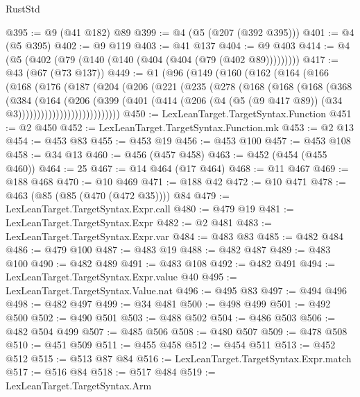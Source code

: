 \begin{lexlean}{RustStd}
\begin{coremodule}
{\begin{coremodule}
{{{{{{{{{{@395 := @9 (@41 @182) @89
@399 := @4 (@5 (@207 (@392 @395)))
@401 := @4 (@5 @395)
@402 := @9 @119
@403 := @41 @137
@404 := @9 @403
@414 := @4 (@5 (@402 (@79 (@140 (@140 (@404 (@404 (@79 (@402 @89)))))))))
@417 := @43 (@67 (@73 @137))
@449 := @1
    (@96
      (@149
        (@160
          (@162
            (@164
              (@166
                (@168
                  (@176
                    (@187
                      (@204
                        (@206
                          (@221
                            (@235
                              (@278
                                (@168
                                  (@168
                                    (@168
                                      (@368
                                        (@384
                                          (@164
                                            (@206
                                              (@399
                                                (@401
                                                  (@414
                                                    (@206
                                                      (@4
                                                        (@5 (@9 @417 @89))
                                                        (@34 @3)))))))))))))))))))))))))))
@450 := LexLeanTarget.TargetSyntax.Function
@451 := @2 @450
@452 := LexLeanTarget.TargetSyntax.Function.mk
@453 := @2 @13
@454 := @453 @83
@455 := @453 @19
@456 := @453 @100
@457 := @453 @108
@458 := @34 @13
@460 := @456 (@457 @458)
@463 := @452 (@454 (@455 @460))
@464 := 25
@467 := @14 @464 (@17 @464)
@468 := @11 @467
@469 := @188 @468
@470 := @10 @469
@471 := @188 @42
@472 := @10 @471
@478 := @463 (@85 (@85 (@470 (@472 @35)))) @84
@479 := LexLeanTarget.TargetSyntax.Expr.call
@480 := @479 @19
@481 := LexLeanTarget.TargetSyntax.Expr
@482 := @2 @481
@483 := LexLeanTarget.TargetSyntax.Expr.var
@484 := @483 @83
@485 := @482 @484
@486 := @479 @100
@487 := @483 @19
@488 := @482 @487
@489 := @483 @100
@490 := @482 @489
@491 := @483 @108
@492 := @482 @491
@494 := LexLeanTarget.TargetSyntax.Expr.value @40
@495 := LexLeanTarget.TargetSyntax.Value.nat
@496 := @495 @83
@497 := @494 @496
@498 := @482 @497
@499 := @34 @481
@500 := @498 @499
@501 := @492 @500
@502 := @490 @501
@503 := @488 @502
@504 := @486 @503
@506 := @482 @504 @499
@507 := @485 @506
@508 := @480 @507
@509 := @478 @508
@510 := @451 @509
@511 := @455 @458
@512 := @454 @511
@513 := @452 @512
@515 := @513 @87 @84
@516 := LexLeanTarget.TargetSyntax.Expr.match
@517 := @516 @84
@518 := @517 @484
@519 := LexLeanTarget.TargetSyntax.Arm
}}}}}}}}}}
\end{coremodule}}
\end{coremodule}
\end{lexlean}
